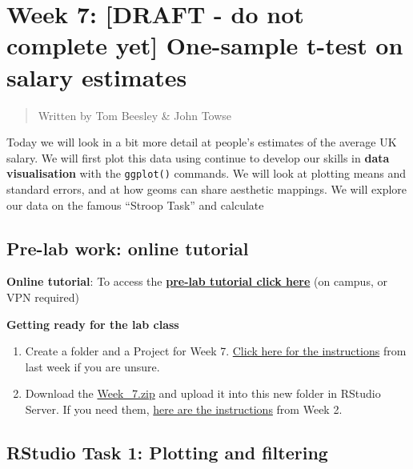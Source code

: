 \documentclass[
]{book}
\begin{document}
\hypertarget{week-7-draft---do-not-complete-yet-one-sample-t-test-on-salary-estimates}{%
\chapter{Week 7: {[}DRAFT - do not complete yet{]} One-sample t-test on salary estimates}\label{week-7-draft---do-not-complete-yet-one-sample-t-test-on-salary-estimates}}

\begin{quote}
Written by Tom Beesley \& John Towse
\end{quote}

Today we will look in a bit more detail at people's estimates of the average UK salary. We will first plot this data using continue to develop our skills in \textbf{data visualisation} with the \texttt{ggplot()} commands. We will look at plotting means and standard errors, and at how geoms can share aesthetic mappings. We will explore our data on the famous ``Stroop Task'' and calculate

\hypertarget{pre-lab-work-online-tutorial-1}{%
\section{Pre-lab work: online tutorial}\label{pre-lab-work-online-tutorial-1}}

\textbf{Online tutorial}: To access the \href{https://ma-rconnect.lancs.ac.uk/Week_7_LabPrep}{\textbf{pre-lab tutorial click here}} (on campus, or VPN required)

\textbf{Getting ready for the lab class}

\begin{enumerate}
\def\labelenumi{\arabic{enumi}.}
\item
  Create a folder and a Project for Week 7. \protect\hyperlink{creating_project}{Click here for the instructions} from last week if you are unsure.
\item
  Download the \href{files/Week_7/Week_7.zip}{Week\_7.zip} and upload it into this new folder in RStudio Server. If you need them, \protect\hyperlink{uploading_zip}{here are the instructions} from Week 2.
\end{enumerate}

\hypertarget{rstudio-task-1-plotting-and-filtering}{%
\section{RStudio Task 1: Plotting and filtering}\label{rstudio-task-1-plotting-and-filtering}}
\end{document}
